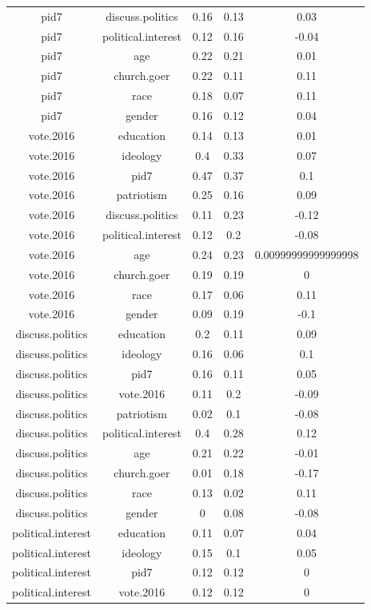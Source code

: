 \begin{longtable}{@{\extracolsep{5pt}} ccccc}
pid7 & discuss.politics & 0.16 & 0.13 & 0.03 \\ 
pid7 & political.interest & 0.12 & 0.16 & -0.04 \\ 
pid7 & age & 0.22 & 0.21 & 0.01 \\ 
pid7 & church.goer & 0.22 & 0.11 & 0.11 \\ 
pid7 & race & 0.18 & 0.07 & 0.11 \\ 
pid7 & gender & 0.16 & 0.12 & 0.04 \\ 
vote.2016 & education & 0.14 & 0.13 & 0.01 \\ 
vote.2016 & ideology & 0.4 & 0.33 & 0.07 \\ 
vote.2016 & pid7 & 0.47 & 0.37 & 0.1 \\ 
vote.2016 & patriotism & 0.25 & 0.16 & 0.09 \\ 
vote.2016 & discuss.politics & 0.11 & 0.23 & -0.12 \\ 
vote.2016 & political.interest & 0.12 & 0.2 & -0.08 \\ 
vote.2016 & age & 0.24 & 0.23 & 0.00999999999999998 \\ 
vote.2016 & church.goer & 0.19 & 0.19 & 0 \\ 
vote.2016 & race & 0.17 & 0.06 & 0.11 \\ 
vote.2016 & gender & 0.09 & 0.19 & -0.1 \\ 
discuss.politics & education & 0.2 & 0.11 & 0.09 \\ 
discuss.politics & ideology & 0.16 & 0.06 & 0.1 \\ 
discuss.politics & pid7 & 0.16 & 0.11 & 0.05 \\ 
discuss.politics & vote.2016 & 0.11 & 0.2 & -0.09 \\ 
discuss.politics & patriotism & 0.02 & 0.1 & -0.08 \\ 
discuss.politics & political.interest & 0.4 & 0.28 & 0.12 \\ 
discuss.politics & age & 0.21 & 0.22 & -0.01 \\ 
discuss.politics & church.goer & 0.01 & 0.18 & -0.17 \\ 
discuss.politics & race & 0.13 & 0.02 & 0.11 \\ 
discuss.politics & gender & 0 & 0.08 & -0.08 \\ 
political.interest & education & 0.11 & 0.07 & 0.04 \\ 
political.interest & ideology & 0.15 & 0.1 & 0.05 \\ 
political.interest & pid7 & 0.12 & 0.12 & 0 \\ 
political.interest & vote.2016 & 0.12 & 0.12 & 0 \\ 

\end{longtable}

